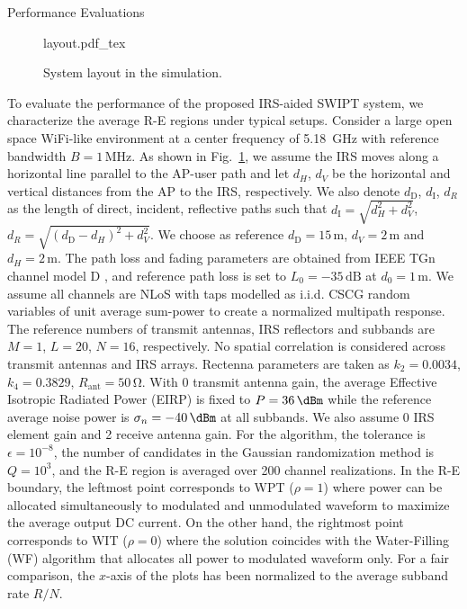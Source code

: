 \documentclass[journal]{IEEEtran}
\begin{document}
	\begin{section}{Performance Evaluations}\label{se:performance_evaluation}
		\begin{figure}[!t]
			\centering
			\def\svgwidth{\columnwidth}
			{layout.pdf_tex}
			\caption{System layout in the simulation.}
			\label{fi:layout}
		\end{figure}
		To evaluate the performance of the proposed IRS-aided SWIPT system, we characterize the average R-E regions under typical setups. Consider a large open space WiFi-like environment at a center frequency of \SI{5.18}{\GHz} with reference bandwidth $B=1\,\si{\MHz}$. As shown in Fig.~\ref{fi:layout}, we assume the IRS moves along a horizontal line parallel to the AP-user path and let $d_H$, $d_V$ be the horizontal and vertical distances from the AP to the IRS, respectively. We also denote $d_\text{D}$, $d_{\text{I}}$, $d_R$ as the length of direct, incident, reflective paths such that $d_{\text{I}}=\sqrt{d_H^2+d_V^2}$, $d_R=\sqrt{(d_\text{D}-d_H)^2+d_V^2}$. We choose as reference $d_\text{D}=15\,\si{\meter}$, $d_V=2\,\si{\meter}$ and $d_H=2\,\si{\meter}$. The path loss and fading parameters are obtained from IEEE TGn channel model D \cite{Erceg2004}, and reference path loss is set to $L_0=-35\,\si{\dB}$ at $d_0=1\,\si{\meter}$. We assume all channels are NLoS with taps modelled as i.i.d. CSCG random variables of unit average sum-power to create a normalized multipath response. The reference numbers of transmit antennas, IRS reflectors and subbands are $M=1$, $L=20$, $N=16$, respectively. No spatial correlation is considered across transmit antennas and IRS arrays. Rectenna parameters are taken as $k_2=0.0034$, $k_4=0.3829$, $R_{\text{ant}}=50\,\si{\ohm}$. With \SI{0}{\dBi} transmit antenna gain, the average Effective Isotropic Radiated Power (EIRP) is fixed to $P=36\,\si{\dBm}$ while the reference average noise power is $\sigma_n=-40\,\si{\dBm}$ at all subbands. We also assume \SI{0}{\dBi} IRS element gain and \SI{2}{\dBi} receive antenna gain. For the algorithm, the tolerance is $\epsilon=10^{-8}$, the number of candidates in the Gaussian randomization method is $Q=10^{3}$, and the R-E region is averaged over \num{200} channel realizations. In the R-E boundary, the leftmost point corresponds to WPT ($\rho=1$) where power can be allocated simultaneously to modulated and unmodulated waveform to maximize the average output DC current.
		On the other hand, the rightmost point corresponds to WIT ($\rho=0$) where the solution coincides with the Water-Filling (WF) algorithm that allocates all power to modulated waveform only. For a fair comparison, the $x$-axis of the plots has been normalized to the average subband rate $R/N$.


\end{section}
\end{document}
